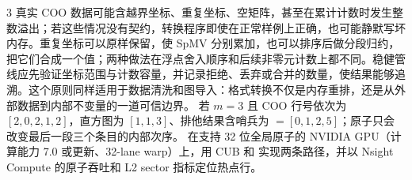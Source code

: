 \begin{solutionexercise}{3}
真实 COO 数据可能含越界坐标、重复坐标、空矩阵，甚至在累计计数时发生整数溢出；若这些情况没有契约，转换程序即使在正常样例上正确，也可能静默写坏内存。重复坐标可以原样保留，使 SpMV 分别累加，也可以排序后做分段归约，把它们合成一个值；两种做法在浮点舍入顺序和后续非零元计数上都不同。稳健管线应先验证坐标范围与计数容量，并记录拒绝、丢弃或合并的数量，使结果能够追溯。这个原则同样适用于数据清洗和图导入：格式转换不仅是内存重排，还是从外部数据到内部不变量的一道可信边界。
\variantheading 若 $m=3$ 且 COO 行号依次为 $[2,0,2,1,2]$，直方图为 $[1,1,3]$、排他结果含哨兵为  $=[0,1,2,5]$；原子只会改变最后一段三个条目的内部次序。
\practiceheading 在支持 32 位全局原子的 NVIDIA GPU（计算能力 7.0 或更新、32-lane warp）上，用 CUB  和  实现两条路径，并以 Nsight Compute 的原子吞吐和 L2 sector 指标定位热点行。
\end{solutionexercise}

